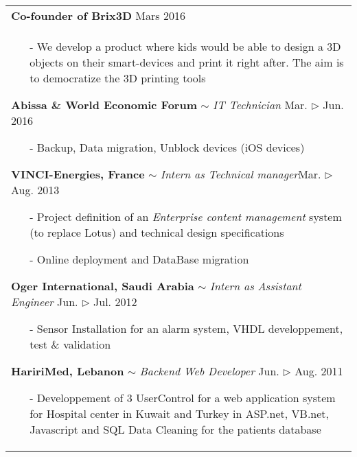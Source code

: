 \documentclass[a4paper,12pt]{article}
\begin{document}
\begin{table}[H]
{\begin{tabular}[t]{ m{180mm}}
\rowcolor{rowcolora}\textbf{Co-founder of Brix3D} \hfill Mars 2016} \\
\vspace{1.2mm}
\begin{itemize}
\item[-] We develop a product where kids would be able to design a 3D objects on their smart-devices and print it right after. The aim is to democratize the 3D printing tools
\end{itemize}
\vspace{1.2mm}

\rowcolor{rowcolora}\textbf{Abissa \& World Economic Forum} $\sim$ \textit{IT Technician} \hfill  {Mar. $\triangleright$ Jun. 2016}
\begin{itemize}
\item[-]\quad Backup, Data migration, Unblock devices (iOS devices)
\end{itemize}
\vspace{2.8mm}
\rowcolor{rowcolora}\textbf{VINCI-Energies, France} $\sim$ \textit{Intern as Technical manager}\hfill  {Mar. $\triangleright$ Aug. 2013}
 

\begin{itemize}
\item[-]\quad Project definition of an \textit{Enterprise content management} system (to replace Lotus) and technical design specifications
\item[-]\quad Online deployment and DataBase migration
\end{itemize}

\vspace{2.8mm}
\rowcolor{rowcolora}\textbf{Oger International, Saudi Arabia} $\sim$ \textit{Intern as Assistant Engineer} \hfill  {Jun. $\triangleright$ Jul. 2012}

\begin{itemize}
\item[-]\quad Sensor Installation for an alarm system, VHDL developpement, test \&  validation
\end{itemize}

\vspace{2.8mm}
\rowcolor{rowcolora}\textbf{HaririMed, Lebanon} $\sim$ \textit{Backend Web Developer} \hfill  {Jun.  $\triangleright$ Aug. 2011}

\begin{itemize}
\item[-]\quad  Developpement of 3 UserControl for a web application system for Hospital center in Kuwait 
and Turkey in ASP.net, VB.net, Javascript and SQL Data Cleaning for the patients database
\end{itemize}
\end{tabular}
}
\end{table}
\end{document}
